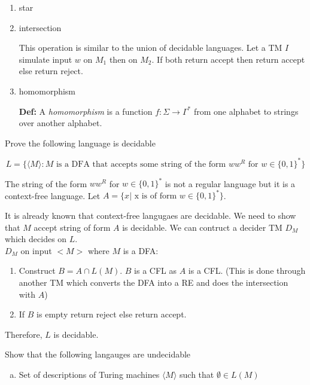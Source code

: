 \documentclass[12pt]{exam}
\begin{document}
\begin{questions}
\begin{solution}
\begin{enumerate}
      \item star

      \item intersection

            This operation is similar to the union of decidable languages. Let a TM $I$ simulate input $w$ on $M_{1}$ then on $M_{2}$. If both return accept then return accept else return reject.

      \item homomorphism

            \textbf{Def:} A \emph{homomorphism} is a function $f:\Sigma\to \Gamma^{*}$ from one alphabet to strings over another alphabet.


    \end{enumerate}


  \end{solution}


  \question{} %
  Prove the following language is decidable

  \[L=\{\langle M \rangle :M\text{ is a DFA that accepts some string of the form } ww^{R} \text{ for } w\in \{0,1\}^{*}\}\]

  \begin{solution}

    The string of the form $ww^{R}$ for $w\in \{0,1\}^{*}$ is not a regular language but it is a context-free language. Let $A = \{ x| \text{ x is of form } w\in \{0,1\}^{*} \}$.

    It is already known that context-free langugaes are decidable. We need to show that $M$ accept string of form $A$ is decidable. We can contruct a decider TM $D_{M}$ which decides on $L$.\\
    $D_{M}$ on input $<M>$ where $M$ is a DFA:
    \begin{enumerate}
      \item Construct $B=A\cap L(M)$. $B$ is a CFL as $A$ is a CFL. (This is done through another TM which converts the DFA into a RE and does the intersection with $A$)
      \item If $B$ is empty return reject else return accept.
    \end{enumerate}

    Therefore, $L$ is decidable.
  \end{solution}

  \question{} %
  Show that the following langauges are undecidable

  \begin{enumerate}[a)]
    \item Set of descriptions of Turing machines $\langle M \rangle$ such that $\emptyset \in L(M)$


\end{enumerate}
\end{questions}
\end{document}
